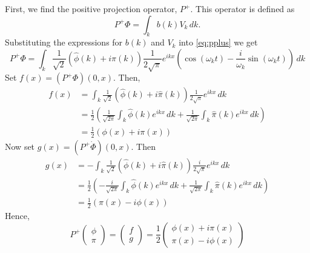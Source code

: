 \documentclass[12pt,oneside]{article}
\begin{document}
First, we find the positive projection operator, $P^+$. This operator is defined as
\begin{equation}\label{eq:pplus}
  P^+\Phi=\int_kb(k)V_k\, dk.
\end{equation}
Substituting the expressions for $b(k)$ and $V_k$ into
\eqref{eq:pplus} we get 
\begin{equation}
  P^+\Phi=\int_k\frac{1}{\sqrt{2}}\left(\hat{\phi}(k)+i\hat{\pi}(k)\right)\frac{1}{2\sqrt{\pi}}e^{ikx}\left(\cos(\omega_{k}t)-\frac{i}{\omega_{k}}\sin(\omega_{k}t)\right)\,dk  
\end{equation}
Set $f(x)=(P^+\Phi)(0,x)$. Then, 
\begin{align*}
  f(x)&=\int_{k}\frac{1}{\sqrt{2}}\left(\hat{\phi}(k)+i\hat{\pi}(k)\right)\frac{1}{2\sqrt{\pi}}e^{ikx}\, dk\\
  &=\frac{1}{2}\left(\frac{1}{\sqrt{2\pi}}\int_{k}\hat{\phi}(k)e^{ikx}\, dk+\frac{1}{\sqrt{2\pi}}\int_{k}\hat{\pi}(k)e^{ikx}\, dk\right)\\
  &=\frac{1}{2}(\phi(x)+i\pi(x))
\end{align*}
Now set $g(x)=(P^+\dot{\Phi})(0,x)$. Then 
\begin{align*}
  g(x)&=-\int_{k}\frac{1}{\sqrt{2}}\left(\hat{\phi}(k)+i\hat{\pi}(k)\right)\frac{i}{2\sqrt{\pi}}e^{ikx}\, dk\\
  &=\frac{1}{2}\left(-\frac{i}{\sqrt{2\pi}}\int_{k}\hat{\phi}(k)e^{ikx}\, dk+\frac{1}{\sqrt{2\pi}}\int_{k}\hat{\pi}(k)e^{ikx}\, dk\right)\\
  &=\frac{1}{2}(\pi(x)-i\phi(x))
\end{align*}
Hence,
\begin{equation}
  P^+\begin{pmatrix}\phi\\ \pi\end{pmatrix}=\begin{pmatrix}f\\
    g\end{pmatrix}=\frac{1}{2}\begin{pmatrix}\phi(x)+i\pi(x)\\ \pi(x)-i\phi(x)\end{pmatrix}
\end{equation}
\end{document}
